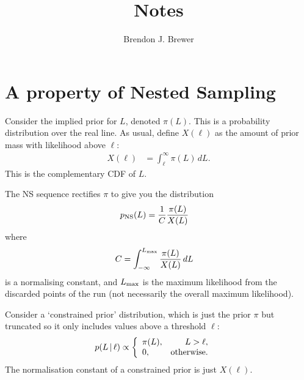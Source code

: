\documentclass[a4paper, 12pt]{article}
\title{Notes}
\author{Brendon J. Brewer}
\date{}
\newcommand{\tn}{\textnormal}
\begin{document}
\maketitle

\setlength{\parindent}{0pt}
\setlength{\parskip}{8pt}

\section{A property of Nested Sampling}
Consider the implied prior for $L$, denoted $\pi(L)$. This is
a probability distribution over the real line.
As usual, define $X(\ell)$ as the amount of prior mass
with likelihood above $\ell$:
\begin{align}
X(\ell) &= \int_\ell^\infty \pi(L) \, dL.
\end{align}
This is the complementary CDF of $L$.

The NS sequence rectifies $\pi$ to give you the distribution
\begin{align}
p_{\rm NS}(L) &= \frac{1}{C} \frac{\pi(L)}{X(L)}
\end{align}
where
\begin{align}
C &= \int_{-\infty}^{L_{\rm max}} \frac{\pi(L)}{X(L)} \, dL
\end{align}
is a normalising constant,
and $L_{\rm max}$ is the maximum likelihood from the
discarded points of the run
(not necessarily the overall maximum likelihood).

Consider a `constrained prior' distribution, which is just the
prior $\pi$ but truncated so it only includes values above
a threshold $\ell$:
\begin{align}
p(L \,|\, \ell) &\propto
               \left\{
                 \begin{array}{lr}
                   \pi(L),&  L > \ell, \\
                   0,     &  \tn{otherwise}.
                 \end{array}
               \right.
\end{align}
The normalisation constant of a constrained prior is
just $X(\ell)$.
\end{document}
